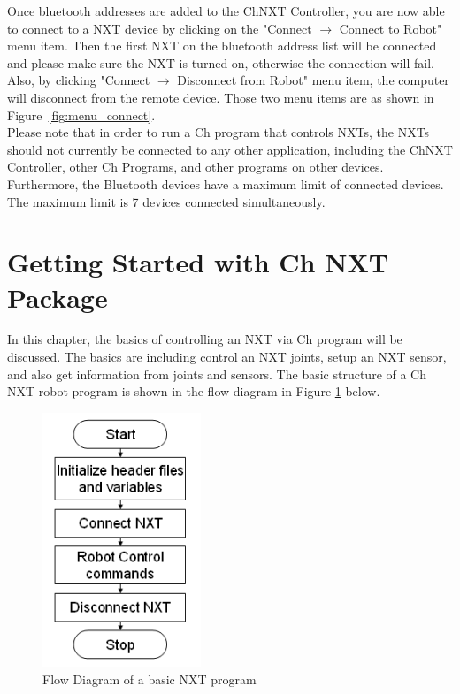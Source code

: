 \documentclass[11pt]{article}
\begin{document}
Once bluetooth addresses are added to the ChNXT Controller, you are now able to connect to a NXT device by clicking on the 
"Connect $\rightarrow$ Connect to Robot" menu item. Then the first NXT on the bluetooth address list will be connected and please make
sure the NXT is turned on, otherwise the connection will fail. Also, by clicking "Connect $\rightarrow$ Disconnect from Robot" menu 
item, the computer will disconnect from the remote device. Those two menu items are as shown in Figure~\ref{fig:menu_connect}.\\

Please note that in order to run a Ch program that controls NXTs, the NXTs should not currently be connected to any other
application, including the ChNXT Controller, other Ch Programs, and other programs on other devices.\\

Furthermore, the Bluetooth devices have a maximum limit of connected devices. The maximum limit is 7 devices connected 
simultaneously.

\newpage
\section{Getting Started with Ch NXT Package}
In this chapter, the basics of controlling an NXT via Ch program will be discussed. The basics are including
control an NXT joints, setup an NXT sensor, and also get information from joints and sensors. The basic structure 
of a Ch NXT robot program is shown in the flow diagram in Figure \ref{fig_NXT_pstruc} below.\\

\begin{figure}[h!]
  \begin{center}
    \includegraphics[height=3in]{figure/mindstorm/NXT_pstruc.png}
    \caption{Flow Diagram of a basic NXT program\label{fig_NXT_pstruc}}
  \end{center}
\end{figure}
\end{document}
